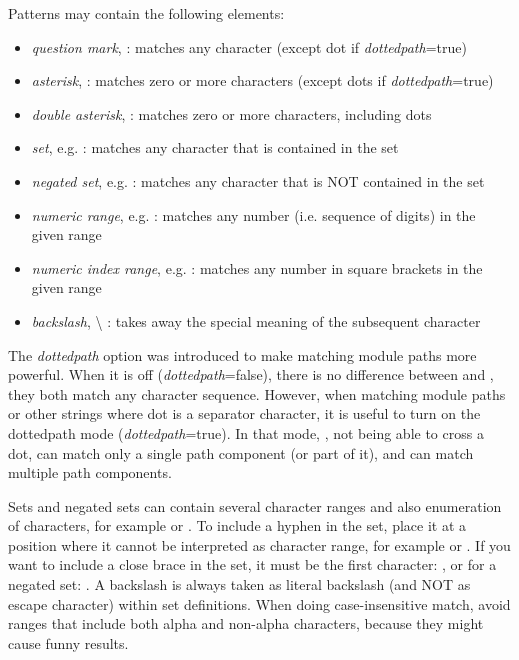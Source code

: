 Patterns may contain the following elements:

\begin{itemize}
  \item \textit{question mark},  : matches any character (except dot if \textit{dottedpath}=true)
  \item \textit{asterisk}, \ttt{*} : matches zero or more characters (except dots if \textit{dottedpath}=true)
  \item \textit{double asterisk}, \ttt{**} : matches zero or more characters, including dots
  \item \textit{set}, e.g.  : matches any character that is contained in the set
  \item \textit{negated set}, e.g. : matches any character that is NOT contained in the set
  \item \textit{numeric range}, e.g.  : matches any number (i.e. sequence of digits) in the given range
  \item \textit{numeric index range}, e.g. \ttt{[38..150]} : matches any number in square brackets in the given range
  \item \textit{backslash}, {\textbackslash} : takes away the special meaning of the subsequent character
\end{itemize}

\begin{note}
The \textit{dottedpath} option was introduced to make matching {\opp}
module paths more powerful. When it is off (\textit{dottedpath}=false),
there is no difference between \ttt{*} and \ttt{**}, they both match any
character sequence. However, when matching {\opp} module paths or other
strings where dot is a separator character, it is useful to turn on the
dottedpath mode (\textit{dottedpath}=true). In that mode, \ttt{*}, not
being able to cross a dot, can match only a single path component (or part
of it), and \ttt{**} can match multiple path components.
\end{note}

Sets and negated sets can contain several character ranges and also
enumeration of characters, for example  or
. To include a hyphen in the set, place it at a position
where it cannot be interpreted as character range, for example
 or . If you want to include a close brace in
the set, it must be the first character: , or for a negated
set: . A backslash is always taken as
literal backslash (and NOT as escape character) within set definitions.
When doing case-insensitive match, avoid ranges that include both alpha and
non-alpha characters, because they might cause funny results.

